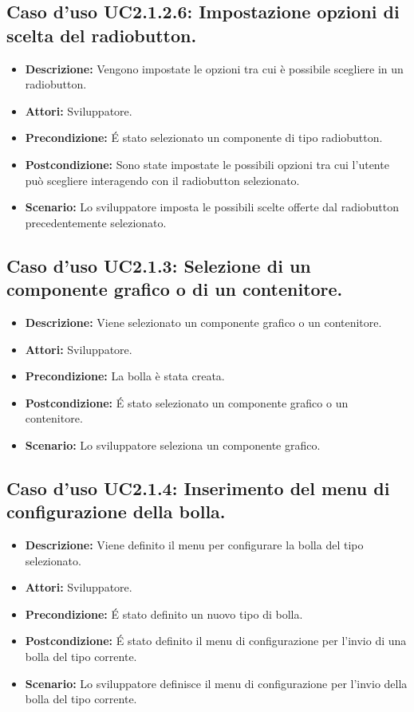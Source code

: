 \subsection{Caso d'uso UC2.1.2.6: Impostazione opzioni di scelta del radiobutton.}
\begin{itemize}
\item[]\textbf{Descrizione:} Vengono impostate le opzioni tra cui è possibile scegliere in un radiobutton.
\item[]\textbf{Attori:} Sviluppatore. 
\item[]\textbf{Precondizione:} \'E stato selezionato un componente di tipo radiobutton. 
\item[]\textbf{Postcondizione:} Sono state impostate le possibili opzioni tra cui l'utente può scegliere interagendo con il radiobutton selezionato. 
\item[]\textbf{Scenario:}
Lo sviluppatore imposta le possibili scelte offerte dal radiobutton precedentemente selezionato. 
\end{itemize}

\subsection{Caso d'uso UC2.1.3: Selezione di un componente grafico o di un contenitore.}
\begin{itemize}
\item[]\textbf{Descrizione:} Viene selezionato un componente grafico o un contenitore.
\item[]\textbf{Attori:} Sviluppatore. 
\item[]\textbf{Precondizione:} La bolla è stata creata. 
\item[]\textbf{Postcondizione:} \'E stato selezionato un componente grafico o un contenitore. 
\item[]\textbf{Scenario:}
 Lo sviluppatore seleziona un componente grafico. 
\end{itemize}

\subsection{Caso d'uso UC2.1.4: Inserimento del menu di configurazione della bolla.}
\begin{itemize}
\item[]\textbf{Descrizione:} Viene definito il menu per configurare la bolla del tipo selezionato.
\item[]\textbf{Attori:} Sviluppatore. 
\item[]\textbf{Precondizione:} \'E stato definito un nuovo tipo di bolla. 
\item[]\textbf{Postcondizione:} \'E stato definito il menu di configurazione per l'invio di una bolla del tipo corrente. 
\item[]\textbf{Scenario:}
Lo sviluppatore definisce il menu di configurazione per l'invio della bolla del tipo corrente. 
\end{itemize}

